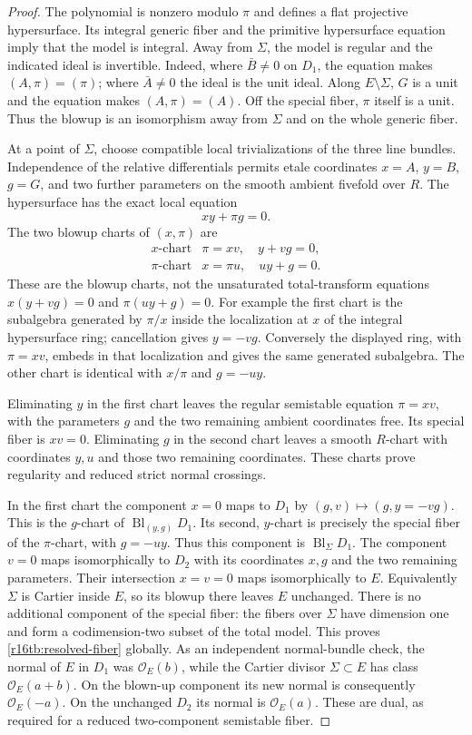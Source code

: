 \begin{proof}
The polynomial is nonzero modulo $\pi$ and defines a flat
projective hypersurface. Its integral generic fiber and the
primitive hypersurface equation imply that the model is integral.
Away from $\Sigma$, the model is regular and the indicated
ideal is invertible. Indeed, where $\bar B\ne0$ on $D_1$,
the equation makes $(A,\pi)=(\pi)$; where $\bar A\ne0$
the ideal is the unit ideal. Along $E\setminus\Sigma$, $G$
is a unit and the equation makes $(A,\pi)=(A)$.
Off the special fiber, $\pi$ itself is a unit. Thus the
blowup is an isomorphism away from $\Sigma$ and on the
whole generic fiber.

At a point of $\Sigma$, choose compatible local trivializations
of the three line bundles. Independence of the relative
differentials permits etale coordinates
$x=A$, $y=B$, $g=G$, and two further parameters on the smooth
ambient fivefold over $R$. The hypersurface has the exact local
equation
\[
                         xy+\pi g=0.
\]
The two blowup charts of $(x,\pi)$ are
\[
 \begin{array}{c|c}
 x\text{-chart}&\pi=xv,\quad y+vg=0,\\
 \pi\text{-chart}&x=\pi u,\quad uy+g=0.
 \end{array}
 \tag{TB16.10}\label{r16tb:charts}
\]
These are the blowup charts, not the unsaturated total-transform
equations $x(y+vg)=0$ and $\pi(uy+g)=0$. For example the first
chart is the subalgebra generated by $\pi/x$ inside the localization
at $x$ of the integral hypersurface ring; cancellation gives
$y=-vg$. Conversely the displayed ring, with $\pi=xv$, embeds
in that localization and gives the same generated subalgebra.
The other chart is identical with $x/\pi$ and $g=-uy$.

Eliminating $y$ in the first chart leaves the regular semistable
equation $\pi=xv$, with the parameters $g$ and the two remaining
ambient coordinates free. Its special fiber is $xv=0$.
Eliminating $g$ in the second chart leaves a smooth $R$-chart
with coordinates $y,u$ and those two remaining coordinates.
These charts prove regularity and reduced strict normal crossings.

In the first chart the component $x=0$ maps to $D_1$ by
$(g,v)\mapsto(g,y=-vg)$. This is the $g$-chart of
$\operatorname{Bl}_{(y,g)}D_1$. Its second, $y$-chart is precisely
the special fiber of the $\pi$-chart, with $g=-uy$.
Thus this component is $\operatorname{Bl}_{\Sigma}D_1$.
The component $v=0$ maps isomorphically to $D_2$ with its
coordinates $x,g$ and the two remaining parameters. Their
intersection $x=v=0$ maps isomorphically to $E$.
Equivalently $\Sigma$ is Cartier inside $E$, so its blowup
there leaves $E$ unchanged. There is no additional component
of the special fiber: the fibers over $\Sigma$ have dimension
one and form a codimension-two subset of the total model.
This proves \eqref{r16tb:resolved-fiber} globally.
As an independent normal-bundle check, the normal of $E$ in $D_1$
was $\mathcal O_E(b)$, while the Cartier divisor $\Sigma\subset E$
has class $\mathcal O_E(a+b)$. On the blown-up component its
new normal is consequently $\mathcal O_E(-a)$. On the unchanged
$D_2$ its normal is $\mathcal O_E(a)$. These are dual, as required
for a reduced two-component semistable fiber.


\end{proof}
